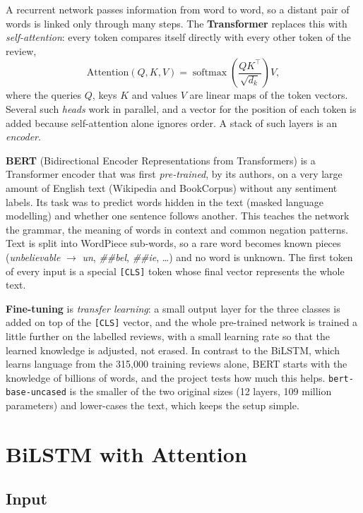 A recurrent network passes information from word to word, so a distant pair of words is linked only through many steps. The \textbf{Transformer} replaces this with \emph{self-attention}: every token compares itself directly with every other token of the review,
\begin{equation*}
    \text{Attention}(Q,K,V)=\operatorname{softmax}\!\left(\frac{QK^\top}{\sqrt{d_k}}\right)V,
\end{equation*}
where the queries $Q$, keys $K$ and values $V$ are linear maps of the token vectors. Several such \emph{heads} work in parallel, and a vector for the position of each token is added because self-attention alone ignores order. A stack of such layers is an \emph{encoder}.

\textbf{BERT} (Bidirectional Encoder Representations from Transformers) is a Transformer encoder that was first \emph{pre-trained}, by its authors, on a very large amount of English text (Wikipedia and BookCorpus) without any sentiment labels. Its task was to predict words hidden in the text (masked language modelling) and whether one sentence follows another. This teaches the network the grammar, the meaning of words in context and common negation patterns. Text is split into WordPiece sub-words, so a rare word becomes known pieces (\emph{unbelievable} $\to$ \emph{un}, \emph{\#\#bel}, \emph{\#\#ie}, \ldots) and no word is unknown. The first token of every input is a special \texttt{[CLS]} token whose final vector represents the whole text.

\textbf{Fine-tuning} is \emph{transfer learning}: a small output layer for the three classes is added on top of the \texttt{[CLS]} vector, and the whole pre-trained network is trained a little further on the labelled reviews, with a small learning rate so that the learned knowledge is adjusted, not erased. In contrast to the BiLSTM, which learns language from the 315{,}000 training reviews alone, BERT starts with the knowledge of billions of words, and the project tests how much this helps. \texttt{bert-base-uncased} is the smaller of the two original sizes (12 layers, 109 million parameters) and lower-cases the text, which keeps the setup simple.

\section{BiLSTM with Attention}
\label{sec:6-3}

\subsection*{Input}

